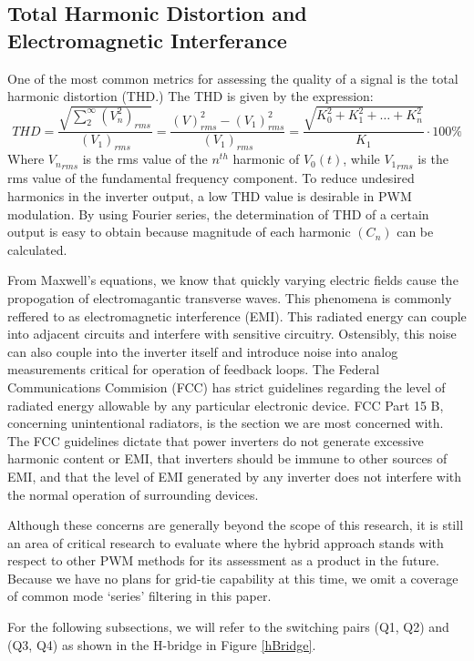 \subsection{Total Harmonic Distortion and Electromagnetic Interferance}
One of the most common metrics for assessing the quality of a signal is the total harmonic distortion (THD.) The THD is given by the expression:
\begin{equation}
THD=\frac{\sqrt{\sum_{2}^{\infty}(V_n^2)_{rms}}}{(V_1)_{rms}} = \frac{(V)_{rms}^2-(V_1)^2_{rms}}{(V_1)_{rms}} = \frac{\sqrt{K_0^2+K_1^2+\ldots+K_n^2}}{K_1}\cdot100\%
\end{equation} 
Where ${V_n}_{rms}$ is the rms value of the $n^{th}$ harmonic of $V_0(t)$, while ${V_1}_{rms}$ is the rms value of the fundamental frequency component. To reduce undesired harmonics in the inverter output, a low THD value is desirable in PWM modulation. By using Fourier series, the determination of THD of a certain output is easy to obtain because magnitude of each harmonic $(C_n)$ can be calculated.

From Maxwell's equations, we know that quickly varying electric fields cause the propogation of electromagantic transverse waves. This phenomena is commonly reffered to as electromagnetic interference (EMI). This radiated energy can couple into adjacent circuits and interfere with sensitive circuitry. Ostensibly, this noise can also couple into the inverter itself and introduce noise into analog measurements critical for operation of feedback loops. The Federal Communications Commision (FCC) has strict guidelines regarding the level of radiated energy allowable by any particular electronic device. FCC Part 15 B, concerning unintentional radiators, is the section we are most concerned with.  The FCC guidelines dictate that power inverters do not generate excessive harmonic content or EMI, that inverters should be immune to other sources of EMI, and that the level of EMI generated by any inverter does not interfere with the normal operation of surrounding devices. 

Although these concerns are generally beyond the scope of this research, it is still an area of critical research to evaluate where the hybrid approach stands with respect to other PWM methods for its assessment as a product in the future. Because we have no plans for grid-tie capability at this time, we omit a coverage of common mode `series' filtering in this paper.

For the following subsections, we will refer to the switching pairs (Q1, Q2) and (Q3, Q4) as shown in the H-bridge in Figure \ref{hBridge}.

